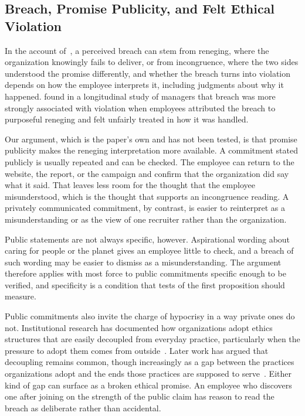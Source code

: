 \subsection{Breach, Promise Publicity, and Felt Ethical Violation}

In the account of~\citet{morrison1997employees}, a perceived breach can stem from reneging, where the organization knowingly fails to deliver, or from incongruence, where the two sides understood the promise differently, and whether the breach turns into violation depends on how the employee interprets it, including judgments about why it happened. \citet{robinson2000development} found in a longitudinal study of managers that breach was more strongly associated with violation when employees attributed the breach to purposeful reneging and felt unfairly treated in how it was handled.

Our argument, which is the paper's own and has not been tested, is that promise publicity makes the reneging interpretation more available. A commitment stated publicly is usually repeated and can be checked. The employee can return to the website, the report, or the campaign and confirm that the organization did say what it said. That leaves less room for the thought that the employee misunderstood, which is the thought that supports an incongruence reading. A privately communicated commitment, by contrast, is easier to reinterpret as a misunderstanding or as the view of one recruiter rather than the organization.

Public statements are not always specific, however. Aspirational wording about caring for people or the planet gives an employee little to check, and a breach of such wording may be easier to dismiss as a misunderstanding. The argument therefore applies with most force to public commitments specific enough to be verified, and specificity is a condition that tests of the first proposition should measure.

Public commitments also invite the charge of hypocrisy in a way private ones do not. Institutional research has documented how organizations adopt ethics structures that are easily decoupled from everyday practice, particularly when the pressure to adopt them comes from outside~\citep{weaver1999integrated}. Later work has argued that decoupling remains common, though increasingly as a gap between the practices organizations adopt and the ends those practices are supposed to serve~\citep{bromley2012smoke}. Either kind of gap can surface as a broken ethical promise. An employee who discovers one after joining on the strength of the public claim has reason to read the breach as deliberate rather than accidental.

